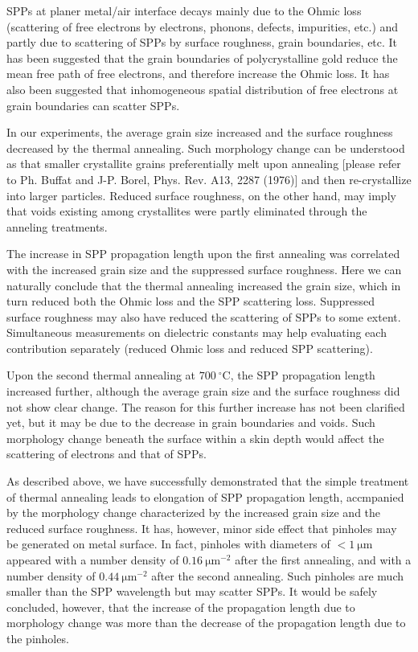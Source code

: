 \documentclass[aip,apl,reprint]{revtex4-1}
\begin{document}
SPPs at planer metal/air interface decays mainly due to the Ohmic loss  (scattering of free electrons by electrons, phonons, defects, impurities, etc.) and partly due to scattering of SPPs by surface roughness, grain boundaries, etc. It has been suggested that the grain boundaries of polycrystalline gold reduce the mean free path of free electrons, and therefore increase the Ohmic loss\cite{Kuttge, Olmon, Trollmann}. It has also been suggested that inhomogeneous spatial distribution of free electrons at grain boundaries can scatter SPPs\cite{Kuttge}. 

In our experiments, the average grain size increased and the surface roughness decreased by the thermal annealing. Such morphology change can be understood as that smaller crystallite grains preferentially melt upon annealing [please refer to Ph. Buffat and J-P. Borel, Phys. Rev. A13, 2287 (1976)] and then re-crystallize into larger particles. Reduced surface roughness, on the other hand, may imply that voids existing among crystallites were partly eliminated through the anneling treatments.  

The increase in SPP propagation length upon the first annealing was correlated with the increased grain size and the suppressed surface roughness. Here we can naturally conclude that the thermal annealing increased the grain size, which in turn reduced both the Ohmic loss and the SPP scattering loss. Suppressed surface roughness may also have reduced the scattering of SPPs to some extent. Simultaneous measurements on dielectric constants may help evaluating each contribution separately (reduced Ohmic loss and reduced SPP scattering). 

Upon the second thermal annealing at $700\:^\circ\mathrm{C}$, the SPP propagation length increased further, although the average grain size and the surface roughness did not show clear change. The reason for this further increase has not been clarified yet, but it may be due to the decrease in grain boundaries and voids. Such morphology change beneath the surface within a skin depth would affect the scattering of electrons and that of SPPs. 

As described above, we have successfully demonstrated that the simple treatment of thermal annealing leads to elongation of SPP propagation length, accmpanied by the morphology change characterized by the increased grain size and the reduced surface roughness. It has, however, minor side effect that pinholes may be generated on metal surface. In fact, pinholes with diameters of $<1\:\mathrm{\mu m}$ appeared with a number density of $0.16\:\mathrm{\mu m}^{-2}$ after the first annealing, and with a number density of $0.44\:\mathrm{\mu m}^{-2}$ after the second annealing. Such pinholes are much smaller than the SPP wavelength but may scatter SPPs. It would be safely concluded, however, that the increase of the propagation length due to morphology change was more than the decrease of the propagation length due to the pinholes.
	
\end{document}
